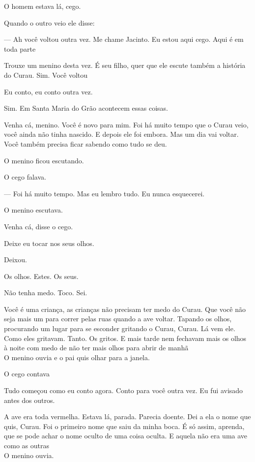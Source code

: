 \vspace*{4cm}

O homem estava lá, cego.

Quando o outro veio ele disse:

--- Ah você voltou outra vez. Me chame Jacinto. Eu estou aqui cego. Aqui é
em toda parte

Trouxe um menino desta vez. É seu filho, quer que ele escute também a
história do Curau. Sim. Você voltou

Eu conto, eu conto outra vez.

Sim. Em Santa Maria do Grão acontecem essas coisas.

Venha cá, menino. Você é novo para mim. Foi há muito tempo que o Curau
veio, você ainda não tinha nascido. E depois ele foi embora. Mas um dia
vai voltar. Você também precisa ficar sabendo como tudo se deu.

O menino ficou escutando.

O cego falava.

--- Foi há muito tempo. Mas eu lembro tudo. Eu nunca esquecerei.

O menino escutava.

Venha cá, disse o cego.

Deixe eu tocar nos seus olhos.

Deixou.

Os olhos. Estes. Os seus.

Não tenha medo. Toco. Sei.

Você é uma criança, as crianças não precisam ter medo do Curau. Que você
não seja mais um para correr pelas ruas quando a ave voltar. Tapando os
olhos, procurando um lugar para se esconder gritando o Curau, Curau. Lá
vem ele. Como eles gritavam. Tanto. Os gritos. E mais tarde nem fechavam
mais os olhos à noite com medo de não ter mais olhos para abrir de manhã\\

O menino ouvia e o pai quis olhar para a janela.

O cego contava

Tudo começou como eu conto agora. Conto para você outra vez. Eu fui
avisado antes dos outros.

A ave era toda vermelha. Estava lá, parada. Parecia doente. Dei a ela o
nome que quis, Curau. Foi o primeiro nome que saiu da minha boca. É só
assim, aprenda, que se pode achar o nome oculto de uma coisa oculta. E
aquela não era uma ave como as outras\\

O menino ouvia.

